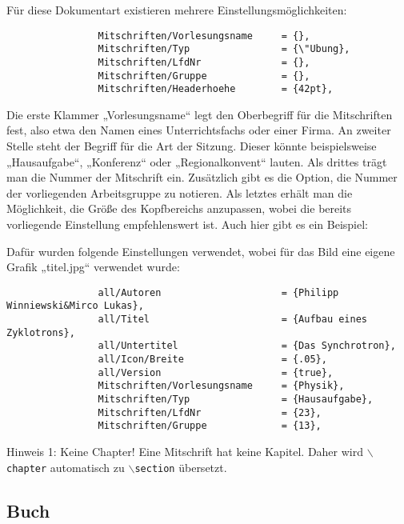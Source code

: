 				Für diese Dokumentart existieren mehrere Einstellungsmöglichkeiten:

				\begin{verbatim}
				Mitschriften/Vorlesungsname     = {},
				Mitschriften/Typ                = {\"Ubung},
				Mitschriften/LfdNr              = {},
				Mitschriften/Gruppe             = {},
				Mitschriften/Headerhoehe        = {42pt},
				\end{verbatim}

				Die erste Klammer „Vorlesungsname“ legt den Oberbegriff für die Mitschriften fest, also etwa den Namen eines Unterrichtsfachs oder einer Firma. An zweiter Stelle steht der Begriff für die Art der Sitzung. Dieser könnte beispielsweise „Hausaufgabe“, „Konferenz“ oder „Regionalkonvent“ lauten. Als drittes trägt man die Nummer der Mitschrift ein. Zusätzlich gibt es die Option, die Nummer der vorliegenden Arbeitsgruppe zu notieren. Als letztes erhält man die Möglichkeit, die Größe des Kopfbereichs anzupassen, wobei die bereits vorliegende Einstellung empfehlenswert ist. Auch hier gibt es ein Beispiel:

				\begin{center}
				\end{center}

				Dafür wurden folgende Einstellungen verwendet, wobei für das Bild eine eigene Grafik „titel.jpg“ verwendet wurde:

				\begin{verbatim}
				all/Autoren						= {Philipp Winniewski&Mirco Lukas},
				all/Titel	 					= {Aufbau eines Zyklotrons},
				all/Untertitel 					= {Das Synchrotron},
				all/Icon/Breite					= {.05},
				all/Version 					= {true},
				Mitschriften/Vorlesungsname 	= {Physik},
				Mitschriften/Typ 				= {Hausaufgabe},
				Mitschriften/LfdNr 				= {23},
				Mitschriften/Gruppe 			= {13},
				\end{verbatim}

				\begin{yellowboxIdx}{Hinweis 1: Keine Chapter!}
					Eine Mitschrift hat keine Kapitel. Daher wird \texttt{$\backslash$chapter} automatisch zu \texttt{$\backslash$section} übersetzt.
				\end{yellowboxIdx}

			\subsection{Buch}

